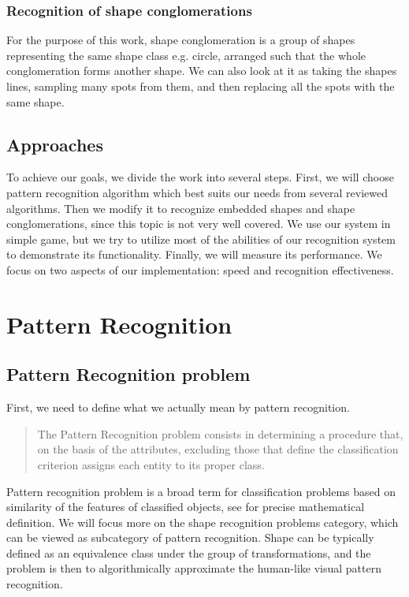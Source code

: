\subsection{Recognition of shape conglomerations}
For the purpose of this work, shape conglomeration is a group of shapes representing the same shape class e.g. circle, arranged such that the whole conglomeration forms another shape. We can also look at it as taking the shapes lines, sampling many spots from them, and then replacing all the spots with the same shape.

\section{Approaches}

To achieve our goals, we divide the work into several steps. First, we will choose pattern recognition algorithm which best suits our needs from several reviewed algorithms. Then we modify it to recognize embedded shapes and shape conglomerations, since this topic is not very well covered. We use our system in simple game, but we try to utilize most of the abilities of our recognition system to demonstrate its functionality. Finally, we will measure its performance. We focus on two aspects of our implementation: speed and recognition effectiveness.

\chapter{Pattern Recognition}

\section{Pattern Recognition problem}
First, we need to define what we actually mean by pattern recognition. \begin{quotation}
The Pattern Recognition problem consists in determining a procedure that, on the basis of the attributes, excluding those that define the classification criterion assigns each entity to its proper class.
\end{quotation} \cite{formalMethods}
 Pattern recognition problem is a broad term for classification problems based on similarity of the features of classified objects, see \cite{formatMethods} for precise mathematical definition. We will focus more on the shape recognition problems category, which can be viewed as subcategory of pattern recognition. Shape can be typically defined as an equivalence class under the group of transformations, and the problem is then to algorithmically approximate the human-like visual pattern recognition. 

